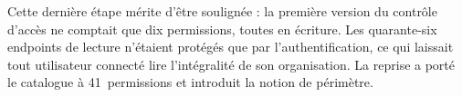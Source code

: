 Cette dernière étape mérite d'être soulignée : la première version du contrôle d'accès
ne comptait que dix permissions, toutes en écriture. Les quarante-six endpoints de
lecture n'étaient protégés que par l'authentification, ce qui laissait tout utilisateur
connecté lire l'intégralité de son organisation. La reprise a porté le catalogue à
41~permissions et introduit la notion de périmètre.

